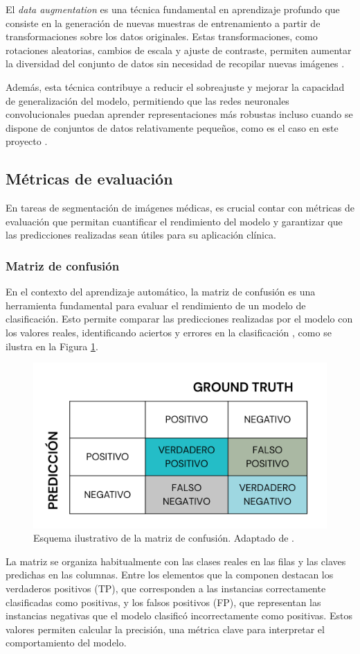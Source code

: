 El \textit{data augmentation} es una técnica fundamental en aprendizaje profundo que consiste en la generación de nuevas muestras de entrenamiento a partir de transformaciones sobre los datos originales. Estas transformaciones, como rotaciones aleatorias, cambios de escala y ajuste de contraste, permiten aumentar la diversidad del conjunto de datos sin necesidad de recopilar nuevas imágenes \cite{shorten2019da}.

Además, esta técnica contribuye a reducir el sobreajuste y mejorar la capacidad de generalización del modelo, permitiendo que las redes neuronales convolucionales puedan aprender representaciones más robustas incluso cuando se dispone de conjuntos de datos relativamente pequeños, como es el caso en este proyecto \cite{perez2017da}.

\subsection{Métricas de evaluación}
En tareas de segmentación de imágenes médicas, es crucial contar con métricas de evaluación que permitan cuantificar el rendimiento del modelo y garantizar que las predicciones realizadas sean útiles para su aplicación clínica.

\subsubsection{Matriz de confusión}
En el contexto del aprendizaje automático, la matriz de confusión es una herramienta fundamental para evaluar el rendimiento de un modelo de clasificación. Esto permite comparar las predicciones realizadas por el modelo con los valores reales, identificando aciertos y errores en la clasificación \cite{matrizconfusion}, como se ilustra en la Figura \ref{fig:matriz_confusion}.

\begin{figure}[h]
    \centering
    \includegraphics[width= 0.8 \textwidth]{img/matriz_confusion.png}
    \caption{Esquema ilustrativo de la matriz de confusión. Adaptado de \cite{matrizconfusionimage}.}
    \label{fig:matriz_confusion}
\end{figure}
La matriz se organiza habitualmente con las clases reales en las filas y las claves predichas en las columnas. Entre los elementos que la componen destacan los verdaderos positivos (TP), que corresponden a las instancias correctamente clasificadas como positivas, y los falsos positivos (FP), que representan las instancias negativas que el modelo clasificó incorrectamente como positivas. Estos valores permiten calcular la precisión, una métrica clave para interpretar el comportamiento del modelo.

